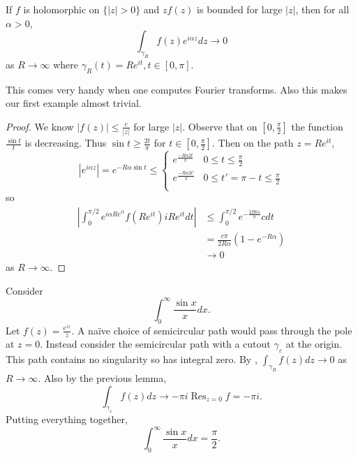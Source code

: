 \documentclass[a4paper]{article}
\DeclareMathOperator*{\res}{Res}
\begin{document}
\begin{lemma}[Jordan]
  \label{lem:Jordan}
  If \(f\) is holomorphic on \(\{|z| > 0\}\) and \(zf(z)\) is bounded for large \(|z|\), then for all \(\alpha > 0\),
  \[
    \int_{\gamma_R} f(z)e^{i\alpha z} dz \to 0
  \]
  as \(R \to \infty\) where \(\gamma_R(t) = Re^{it}, t \in [0, \pi]\).
\end{lemma}

This comes very handy when one computes Fourier transforms. Also this makes our first example almost trivial.

\begin{proof}
  We know \(|f(z)| \leq \frac{c}{|z|}\) for large \(|z|\). Observe that on \([0, \frac{\pi}{2}]\) the function \(\frac{\sin t}{t}\) is decreasing. Thus \(\sin t \geq \frac{2t}{\pi}\) for \(t \in [0, \frac{\pi}{2}]\). Then on the path \(z = Re^{it}\),
  \[
    |e^{i\alpha z}| = e^{-R\alpha\sin t} \leq
    \begin{cases}
      e^{\frac{-R\alpha 2t}{\pi}} & 0 \leq t \leq \frac{\pi}{2} \\
      e^{\frac{-R\alpha 2t'}{\pi}} & 0 \leq t' = \pi - t \leq \frac{\pi}{2} \\
    \end{cases}
  \]
so
\begin{align*}
  \left| \int_0^{\pi/2} e^{i\alpha R e^{it}} f(Re^{it}) iRe^{it} dt \right|
  &\leq \int_0^{\pi/2} e^{-\frac{2Rt\alpha}{\pi}}c dt \\
  &= \frac{c\pi}{2R \alpha} (1 - e^{-R \alpha}) \\
  &\to 0
\end{align*}
as \(R \to \infty\).
\end{proof}

\begin{eg}
  Consider
  \[
    \int_0^\infty \frac{\sin x}{x} dx.
  \]
  Let \(f(z) = \frac{e^{iz}}{z}\). A naïve choice of semicircular path would pass through the pole at \(z = 0\). Instead consider the semicircular path with a cutout \(\gamma_\varepsilon\) at the origin. This path contains no singularity so has integral zero. By , \(\int_{\gamma_R} f(z) dz \to 0\) as \(R \to \infty\). Also by the previous lemma,
  \[
    \int_{\gamma_\varepsilon} f(z) dz \to - \pi i \res_{z = 0} f = -\pi i.
  \]
  Putting everything together,
  \[
    \int_0^\infty \frac{\sin x}{x} dx = \frac{\pi}{2}.
  \]
\end{eg}
\end{document}

